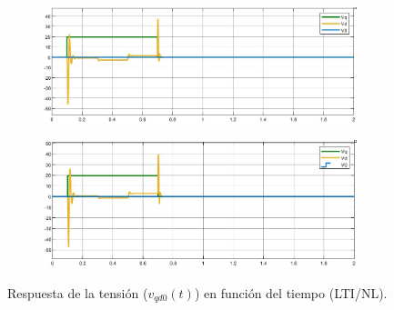 \documentclass{article}
\begin{document}
\begin{figure}[H]
    \centering
    \begin{subfigure}[b]{0.8\textwidth}
        \includegraphics[width=\textwidth]{5.1.6_vqd0.jpg}
    \end{subfigure}
    \begin{subfigure}[b]{0.8\textwidth}
        \includegraphics[width=1\textwidth]{5.1.6_vqd0_NL.jpg}
    \end{subfigure}
    \caption{Respuesta de la tensión ($v_{qd0}(t)$) en función del tiempo (LTI/NL).}
    \label{fig:temperatura}
\end{figure}
\end{document}
